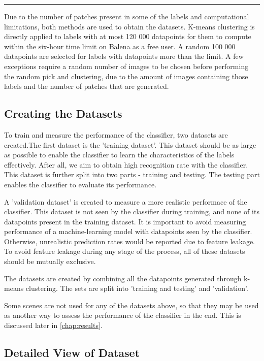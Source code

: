 \documentclass[dissertation.tex]{subfiles}
\begin{document}

\rule{200pt}{1pt}

Due to the number of patches present in some of the labels and computational limitations, both methods are used to obtain the datasets. K-means clustering is directly applied to labels with at most 120 000 datapoints for them to compute within the six-hour time limit on Balena as a free user. A random 100 000 datapoints are selected for labels with datapoints more than the limit. A few exceptions require a random number of images to be chosen before performing the random pick and clustering, due to the amount of images containing those labels and the number of patches that are generated. 

\subsection{Creating the Datasets}
To train and measure the performance of the classifier, two datasets are created.The first dataset is the 'training dataset'. This dataset should be as large as possible to enable the classifier to learn the characteristics of the labels effectively. After all, we aim to obtain high recognition rate with the classifier. This dataset is further split into two parts - training and testing. The testing part enables the classifier to evaluate its performance.

A 'validation dataset' is created to measure a more realistic performace of the classifier. This dataset is not seen by the classifier during training, and none of its datapoints present in the training dataset. It is important to avoid measuring performance of a machine-learning model with datapoints seen by the classifier. Otherwise, unrealistic prediction rates would be reported due to feature leakage. To avoid feature leakage during any stage of the process, all of these datasets should be mutually exclusive.

The datasets are created by combining all the datapoints generated through k-means clustering. The sets are split into 'training and testing' and 'validation'.

Some scenes are not used for any of the datasets above, so that they may be used as another way to assess the performance of the classifier in the end. This is discussed later in \autoref{chap:results}.

\subsection{Detailed View of Dataset}
\end{document}
